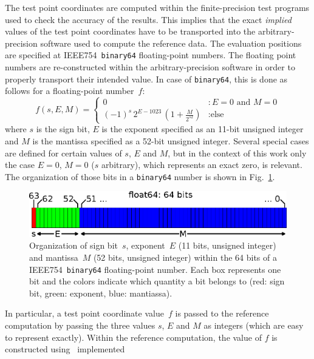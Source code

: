 The test point coordinates are computed within the finite-precision test programs used to check the accuracy of the results.
This implies that the exact \textit{implied} values of the test point coordinates have to be transported
into the arbitrary-precision software used to compute the reference data.
The evaluation positions are specified at IEEE754~\texttt{binary64} floating-point numbers.
The floating point numbers are re-constructed within the arbitrary-precision software
in order to properly transport their intended value.
In case of \texttt{binary64}, this is done as follows for a floating-point number~$f$:
\begin{equation}
 f(s, E, M) =
 \begin{cases}
   0                                                             &: E=0 \textrm{ and } M=0 \\
   (-1)^s \, 2^{E - 1023} \, \left( 1 + \frac{M}{2^{52}} \right) &: \textrm{else}
  \end{cases} \label{eqn:binary64}
\end{equation}
where $s$ is the sign bit, $E$ is the exponent specified as an 11-bit unsigned integer
and $M$ is the mantissa specified as a 52-bit unsigned integer.
Several special cases are defined for certain values of $s$, $E$ and $M$,
but in the context of this work only the case $E=0$, $M=0$ ($s$ arbitrary),
which represents an exact zero, is relevant.
The organization of those bits in a \texttt{binary64} number is shown in Fig.~\ref{fig:binary64}.
\begin{figure}[htbp]
 \centering
 \includegraphics{img/IEEE754_binary64.eps}
 \caption{Organization of sign bit~$s$, exponent~$E$ (11 bits, unsigned integer)
          and mantissa~$M$ (52 bits, unsigned integer) within the 64 bits
          of a IEEE754~\texttt{binary64} floating-point number.
          Each box represents one bit and the colors indicate which quantity a bit belongs to
          (red: sign bit, green: exponent, blue: mantiassa).}
 \label{fig:binary64}
\end{figure}
In particular, a test point coordinate value~$f$ is passed to the reference computation
by passing the three values $s$, $E$ and $M$ as integers (which are easy to represent exactly).
Within the reference computation, the value of $f$ is constructed using~ implemented
